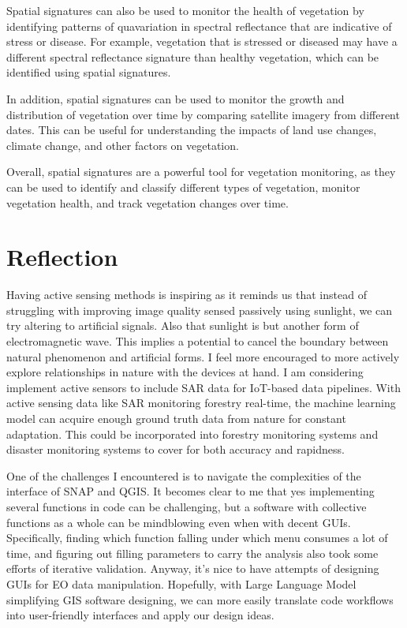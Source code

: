 \documentclass[
  letterpaper,
  DIV=11,
  numbers=noendperiod]{scrreprt}
\begin{document}
Spatial signatures can also be used to monitor the health of vegetation
by identifying patterns of quavariation in spectral reflectance that are
indicative of stress or disease. For example, vegetation that is
stressed or diseased may have a different spectral reflectance signature
than healthy vegetation, which can be identified using spatial
signatures.

In addition, spatial signatures can be used to monitor the growth and
distribution of vegetation over time by comparing satellite imagery from
different dates. This can be useful for understanding the impacts of
land use changes, climate change, and other factors on vegetation.

Overall, spatial signatures are a powerful tool for vegetation
monitoring, as they can be used to identify and classify different types
of vegetation, monitor vegetation health, and track vegetation changes
over time.

\hypertarget{reflection}{%
\section{Reflection}\label{reflection}}

Having active sensing methods is inspiring as it reminds us that instead
of struggling with improving image quality sensed passively using
sunlight, we can try altering to artificial signals. Also that sunlight
is but another form of electromagnetic wave. This implies a potential to
cancel the boundary between natural phenomenon and artificial forms. I
feel more encouraged to more actively explore relationships in nature
with the devices at hand. I am considering implement active sensors to
include SAR data for IoT-based data pipelines. With active sensing data
like SAR monitoring forestry real-time, the machine learning model can
acquire enough ground truth data from nature for constant adaptation.
This could be incorporated into forestry monitoring systems and disaster
monitoring systems to cover for both accuracy and rapidness.

One of the challenges I encountered is to navigate the complexities of
the interface of SNAP and QGIS. It becomes clear to me that yes
implementing several functions in code can be challenging, but a
software with collective functions as a whole can be mindblowing even
when with decent GUIs. Specifically, finding which function falling
under which menu consumes a lot of time, and figuring out filling
parameters to carry the analysis also took some efforts of iterative
validation. Anyway, it's nice to have attempts of designing GUIs for EO
data manipulation. Hopefully, with Large Language Model simplifying GIS
software designing, we can more easily translate code workflows into
user-friendly interfaces and apply our design ideas.
\end{document}
